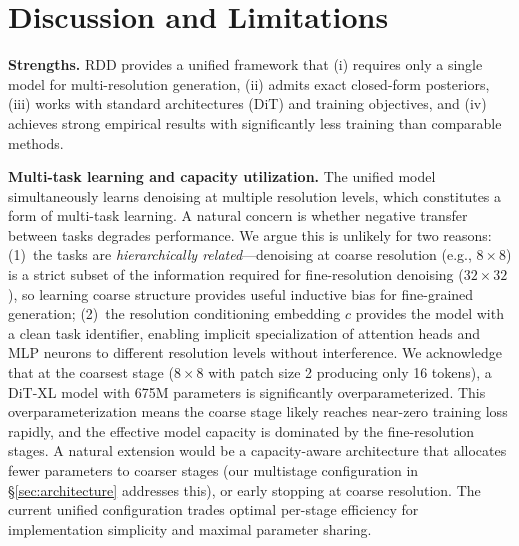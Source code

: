 \documentclass[10pt]{article}
\begin{document}
\fi

\section{Discussion and Limitations}
\label{sec:discussion}

\textbf{Strengths.}
RDD provides a unified framework that (i) requires only a single model for multi-resolution generation, (ii) admits exact closed-form posteriors, (iii) works with standard architectures (DiT) and training objectives, and (iv) achieves strong empirical results with significantly less training than comparable methods.

\textbf{Multi-task learning and capacity utilization.}
The unified model simultaneously learns denoising at multiple resolution levels, which constitutes a form of multi-task learning.
A natural concern is whether negative transfer between tasks degrades performance.
We argue this is unlikely for two reasons: (1)~the tasks are \emph{hierarchically related}---denoising at coarse resolution (e.g., $8\times8$) is a strict subset of the information required for fine-resolution denoising ($32\times32$), so learning coarse structure provides useful inductive bias for fine-grained generation; (2)~the resolution conditioning embedding $c$ provides the model with a clean task identifier, enabling implicit specialization of attention heads and MLP neurons to different resolution levels without interference.
We acknowledge that at the coarsest stage ($8\times8$ with patch size 2 producing only 16 tokens), a DiT-XL model with 675M parameters is significantly overparameterized.
This overparameterization means the coarse stage likely reaches near-zero training loss rapidly, and the effective model capacity is dominated by the fine-resolution stages.
A natural extension would be a capacity-aware architecture that allocates fewer parameters to coarser stages (our multistage configuration in \S\ref{sec:architecture} addresses this), or early stopping at coarse resolution.
The current unified configuration trades optimal per-stage efficiency for implementation simplicity and maximal parameter sharing.
\end{document}
